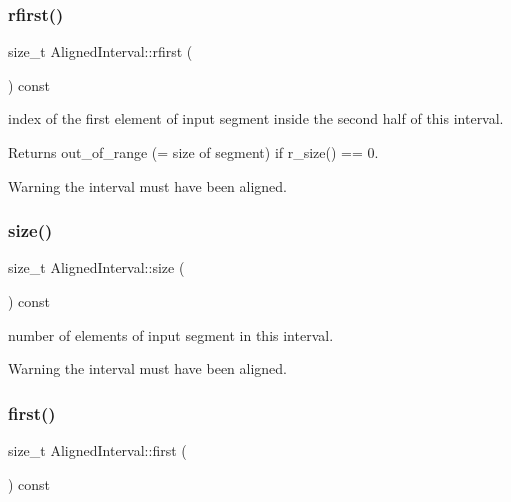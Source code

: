 \subsubsection{\texorpdfstring{rfirst()}{rfirst()}}
{\footnotesize\ttfamily size\+\_\+t Aligned\+Interval\+::rfirst (\begin{DoxyParamCaption}{ }\end{DoxyParamCaption}) const\hspace{0.3cm}{\ttfamily [inline]}}



index of the first element of input segment inside the second half of this interval. 

\begin{DoxyReturn}{Returns}
out\+\_\+of\+\_\+range (= size of segment) if r\+\_\+size() == 0. 
\end{DoxyReturn}
\begin{DoxyWarning}{Warning}
the interval must have been aligned. 
\end{DoxyWarning}
\mbox{\label{classAlignedInterval_aacfe86f36bfd28f6a56c7a673ed7dad7}} 
\subsubsection{\texorpdfstring{size()}{size()}}
{\footnotesize\ttfamily size\+\_\+t Aligned\+Interval\+::size (\begin{DoxyParamCaption}{ }\end{DoxyParamCaption}) const\hspace{0.3cm}{\ttfamily [inline]}}



number of elements of input segment in this interval. 

\begin{DoxyWarning}{Warning}
the interval must have been aligned. 
\end{DoxyWarning}
\mbox{\label{classAlignedInterval_a1660736ae6e829e6c92616e49784a583}} 
\subsubsection{\texorpdfstring{first()}{first()}}
{\footnotesize\ttfamily size\+\_\+t Aligned\+Interval\+::first (\begin{DoxyParamCaption}{ }\end{DoxyParamCaption}) const\hspace{0.3cm}{\ttfamily [inline]}}



